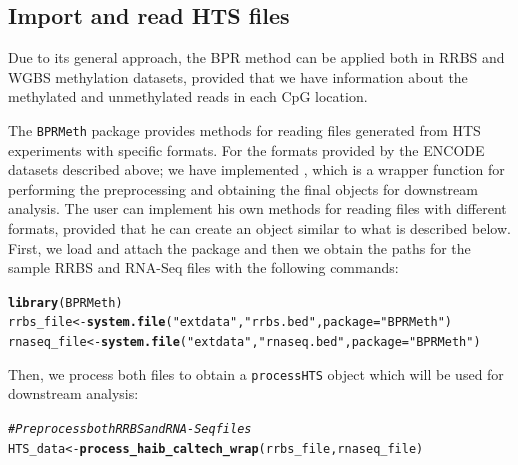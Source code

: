 \documentclass{article}\usepackage[]{graphicx}\usepackage[usenames,dvipsnames]{color}
\makeatletter
\newcommand{\hlstr}[1]{\textcolor[rgb]{0.192,0.494,0.8}{#1}}%
\newcommand{\hlcom}[1]{\textcolor[rgb]{0.678,0.584,0.686}{\textit{#1}}}%
\newcommand{\hlstd}[1]{\textcolor[rgb]{0.345,0.345,0.345}{#1}}%
\newcommand{\hlkwb}[1]{\textcolor[rgb]{0.69,0.353,0.396}{#1}}%
\newcommand{\hlkwc}[1]{\textcolor[rgb]{0.333,0.667,0.333}{#1}}%
\newcommand{\hlkwd}[1]{\textcolor[rgb]{0.737,0.353,0.396}{\textbf{#1}}}%
\newenvironment{kframe}{%
 \def\at@end@of@kframe{}%
 \ifinner\ifhmode%
  \def\at@end@of@kframe{\end{minipage}}%
  \begin{minipage}{\columnwidth}%
 \fi\fi%
 \def\FrameCommand##1{\hskip\@totalleftmargin \hskip-\fboxsep
 \colorbox{shadecolor}{##1}\hskip-\fboxsep
     \hskip-\linewidth \hskip-\@totalleftmargin \hskip\columnwidth}%
 \MakeFramed {\advance\hsize-\width
   \@totalleftmargin\z@ \linewidth\hsize
   \@setminipage}}%
 {\par\unskip\endMakeFramed%
 \at@end@of@kframe}
\makeatother
\begin{document}
\subsection{Import and read HTS files}
Due to its general approach, the BPR method can be applied both in RRBS and WGBS methylation datasets, provided that we have information about the methylated and unmethylated reads in each CpG location.

The \verb|BPRMeth| package provides methods for reading files generated from HTS experiments with specific formats. For the formats provided by the ENCODE datasets described above; we have implemented , which is a wrapper function for performing the preprocessing and obtaining the final objects for downstream analysis. The user can implement his own methods for reading files with different formats, provided that he can create an object similar to what is described below. First, we load and attach the package and then we obtain the paths for the sample RRBS and RNA-Seq files with the following commands:
\begin{kframe}
\begin{alltt}
\hlkwd{library}\hlstd{(BPRMeth)}
\hlstd{rrbs_file} \hlkwb{<-} \hlkwd{system.file}\hlstd{(}\hlstr{"extdata"}\hlstd{,} \hlstr{"rrbs.bed"}\hlstd{,} \hlkwc{package} \hlstd{=} \hlstr{"BPRMeth"}\hlstd{)}
\hlstd{rnaseq_file} \hlkwb{<-} \hlkwd{system.file}\hlstd{(}\hlstr{"extdata"}\hlstd{,} \hlstr{"rnaseq.bed"}\hlstd{,} \hlkwc{package} \hlstd{=} \hlstr{"BPRMeth"}\hlstd{)}
\end{alltt}
\end{kframe}

Then, we process both files to obtain a \verb|processHTS| object which will be used for downstream analysis:
\begin{kframe}
\begin{alltt}
\hlcom{# Preprocess both RRBS and RNA-Seq files}
\hlstd{HTS_data} \hlkwb{<-} \hlkwd{process_haib_caltech_wrap}\hlstd{(rrbs_file, rnaseq_file)}
\end{alltt}
\end{kframe}
\end{document}
